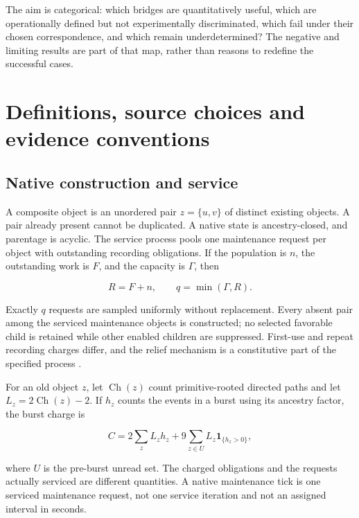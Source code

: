 \documentclass[11pt,a4paper]{article}
\begin{document}
The aim is categorical: which bridges are quantitatively useful, which are operationally defined but not experimentally discriminated, which fail under their chosen correspondence, and which remain underdetermined? The negative and limiting results are part of that map, rather than reasons to redefine the successful cases.

\section{Definitions, source choices and evidence conventions}\label{definitions-source-choices-and-evidence-conventions}

\subsection{Native construction and service}\label{native-construction-and-service}

A composite object is an unordered pair \(z=\{u,v\}\) of distinct existing objects. A pair already present cannot be duplicated. A native state is ancestry-closed, and parentage is acyclic. The service process pools one maintenance request per object with outstanding recording obligations. If the population is \(n\), the outstanding work is \(F\), and the capacity is \(\Gamma\), then

\begin{equation}\label{eq:2}
R=F+n,\qquad q=\min(\Gamma,R).
\end{equation}

Exactly \(q\) requests are sampled uniformly without replacement. Every absent pair among the serviced maintenance objects is constructed; no selected favorable child is retained while other enabled children are suppressed. First-use and repeat recording charges differ, and the relief mechanism is a constitutive part of the specified process \cite[Section 2]{D2}.

For an old object \(z\), let \(\operatorname{Ch}(z)\) count primitive-rooted directed paths and let \(L_z=2\operatorname{Ch}(z)-2\). If \(h_z\) counts the events in a burst using its ancestry factor, the burst charge is

\begin{equation}\label{eq:3}
C=2\sum_z L_z h_z+9\sum_{z\in U}L_z\mathbf 1_{\{h_z>0\}},
\end{equation}

where \(U\) is the pre-burst unread set. The charged obligations and the requests actually serviced are different quantities. A native maintenance tick is one serviced maintenance request, not one service iteration and not an assigned interval in seconds.
\end{document}
